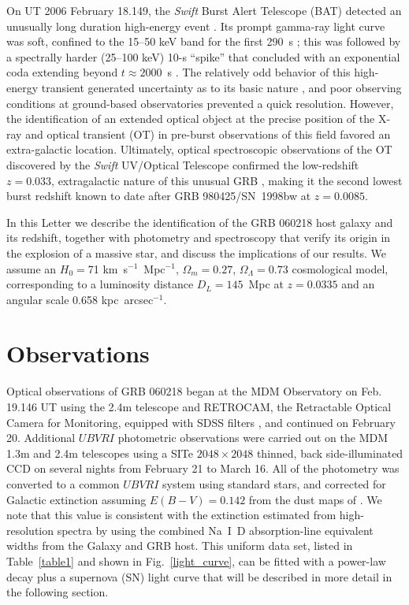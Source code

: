 \documentclass[apj]{emulateapj}
\begin{document}
On UT 2006 February 18.149, the {\it Swift\/} Burst Alert Telescope
(BAT) detected an unusually long duration high-energy event \citep{cusumano}.
Its prompt gamma-ray light curve was soft, confined to the 15--50 keV band
for the first 290~s \citep{barbier}; this was followed by a spectrally 
harder (25--100 keV) 10-s ``spike'' that concluded with an exponential
coda extending beyond $t \approx 2000$~s \citep{barthelmy}. 
The relatively odd behavior of this high-energy transient
generated uncertainty as to its basic nature 
\citep[][and references therein]{gehrels},
and poor observing conditions at ground-based
observatories prevented a quick resolution.
However, the identification of an extended optical object
at the precise position of the X-ray and optical transient (OT)
in pre-burst observations of this field \citep{cool,mirabal1}
favored an extra-galactic location.  Ultimately,
optical spectroscopic observations of the OT discovered 
by the {\it Swift\/} UV/Optical Telescope \citep{cusumano} 
confirmed the low-redshift $z = 0.033$, extragalactic nature of this
unusual GRB \citep{mirabal2}, making it the second lowest burst 
redshift known to date after GRB 980425/SN~1998bw at $z=0.0085$. 

In this Letter we describe the identification of the GRB 
060218 host galaxy and its redshift, together with 
photometry and spectroscopy that verify its origin 
in the explosion of a massive star, and discuss the
implications of our results.
We assume an $H_0 = $71 km~s$^{-1}$~Mpc$^{-1}$, $\Omega_m = 0.27$,
$\Omega_{\Lambda} = 0.73$ cosmological model, corresponding
to a luminosity distance $D_{L} = 145$~Mpc at $z = 0.0335$
and an angular scale 0.658 kpc~arcsec$^{-1}$.


\section{Observations}


Optical observations of GRB 060218 began at the MDM Observatory
on Feb. 19.146 UT using the 2.4m telescope and RETROCAM, the Retractable
Optical Camera for Monitoring,
equipped with SDSS filters \citep{morgan}, and continued on February 20.
Additional $UBVRI$ photometric observations were carried out 
on the MDM 1.3m and 2.4m telescopes using a SITe $2048 \times 2048$ 
thinned, back side-illuminated CCD on several nights from February 21
to March 16.  All of the photometry was converted to a common 
$UBVRI$ system using \citet{landolt} standard stars, and corrected
for Galactic extinction assuming $E(B-V)= 0.142$ from the dust maps of 
\citet{schlegel}.
We note that this value is consistent with the extinction estimated
from high-resolution spectra by \citet{guenther} using
the combined Na~I~D absorption-line equivalent widths from the
Galaxy and GRB host.
This uniform data set, listed in Table~\ref{table1} and shown in 
Fig.~\ref{light_curve}, can be fitted with a power-law decay plus a
supernova (SN) 
light curve that will be described in more detail in the following section. 
\end{document}
